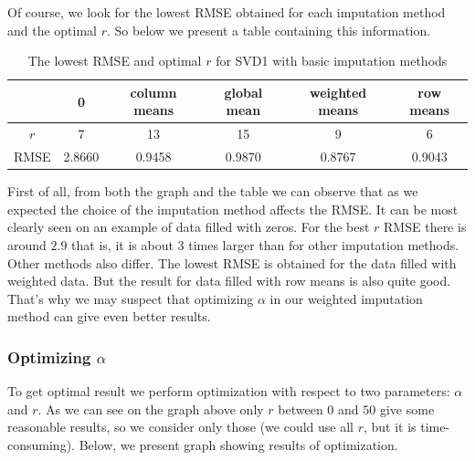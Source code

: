 \documentclass[10pt]{amsart}
\begin{document}
Of course, we look for the lowest RMSE obtained for each imputation method and the optimal $r$.
So below we present a table containing this information.
\begin{table}[H]
\begin{tabular}{c|ccccc}
& 0 & column means & global mean & weighted means & row means \\
\hline
$r$ & 7 & 13 & 15 & 9 & 6 \\
RMSE & 2.8660 & 0.9458 & 0.9870 & 0.8767 & 0.9043 \\
\end{tabular}
\caption{The lowest RMSE and optimal $r$ for SVD1 with basic imputation methods}
\end{table}

First of all, from both the graph and the table we can observe that as we expected the choice of the imputation method affects the RMSE.
It can be most clearly seen on an example of data filled with zeros.
For the best $r$ RMSE there is around $2.9$ that is, it is about 3 times larger than for other imputation methods.
Other methods also differ.
The lowest RMSE is obtained for the data filled with weighted data.
But the result for data filled with row means is also quite good.
That's why we may suspect that optimizing $\alpha$ in our weighted imputation method can give even better results.


\subsubsection*{Optimizing $\alpha$}

To get optimal result we perform optimization with respect to two parameters: $\alpha$ and $r$.
As we can see on the graph above only $r$ between $0$ and $50$ give some reasonable results, so we consider only those (we could use all $r$, but it is time-consuming).
Below, we present graph showing results of optimization.
\end{document}
